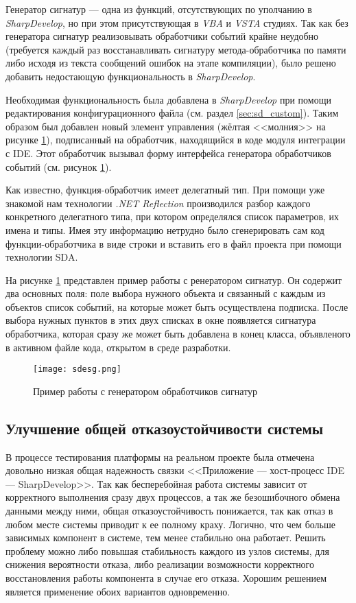 Генератор сигнатур --- одна из функций, отсутствующих по уполчанию в {\it SharpDevelop}, но при этом присутствующая в {\it VBA} и {\it VSTA} студиях. Так как без генератора сигнатур реализовывать обработчики событий крайне неудобно (требуется каждый раз восстанавливать сигнатуру метода-обработчика по памяти либо исходя из текста сообщений ошибок на этапе компиляции), было решено добавить недостающую функциональность в {\it SharpDevelop}.

Необходимая функциональность была добавлена в {\it SharpDevelop} при помощи редактирования конфигурационного файла (см. раздел \ref{sec:sd_custom}). Таким образом был добавлен новый элемент управления (жёлтая <<молния>> на рисунке \ref{pic:sdesg}), подписанный на обработчик, находящийся в коде модуля интеграции с IDE. Этот обработчик вызывал форму интерфейса генератора обработчиков событий (см. рисунок \ref{pic:sdesg}).

Как известно, функция-обработчик имеет делегатный тип. При помощи уже знакомой нам технологии {\it .NET Reflection} производился разбор каждого конкретного делегатного типа, при котором определялся список параметров, их имена и типы. Имея эту информацию нетрудно было сгенерировать сам код функции-обработчика в виде строки и вставить его в файл проекта при помощи технологии SDA.

На рисунке \ref{pic:sdesg} представлен пример работы с ренератором сигнатур. Он содержит два основных поля: поле выбора нужного объекта и связанный с каждым из объектов список событий, на которые может быть осуществлена подписка. После выбора нужных пунктов в этих двух списках в окне появляется сигнатура обработчика, которая сразу же может быть добавлена в конец класса, объявленого в активном файле кода, открытом в среде разработки.

\begin{figure}[!h]
    \centering
    \texttt{[image: sdesg.png]}
    \caption{Пример работы с генератором обработчиков сигнатур}
    \label{pic:sdesg}
\end{figure}

 
\subsection{Улучшение общей отказоустойчивости системы}
\label{sec:stability}

В процессе тестирования платформы на реальном проекте была отмечена довольно низкая общая надежность связки <<Приложение --- хост-процесс IDE --- SharpDevelop>>. Так как бесперебойная работа системы зависит от корректного выполнения сразу двух процессов, а так же безошибочного обмена данными между ними, общая отказоустойчивость понижается, так как отказ в любом месте системы приводит к ее полному краху. Логично, что чем больше зависимых компонент в системе, тем менее стабильно она работает. Решить проблему можно либо повышая стабильность каждого из узлов системы, для снижения вероятности отказа, либо реализации возможности корректного восстановления работы компонента в случае его отказа. Хорошим решением является применение обоих вариантов одновременно.

